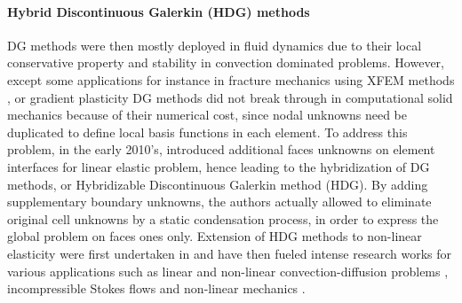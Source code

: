 
\paragraph{Hybrid Discontinuous Galerkin (HDG) methods}

DG methods were then mostly deployed in fluid dynamics \cite{shahbazi_high-order_2007, persson_discontinuous_2009} due to their local conservative property and stability in convection dominated problems.
However, except some applications for instance in fracture mechanics using XFEM methods
\cite{gracie_blending_2008, shen_stability_2010}, or gradient plasticity \cite{djoko_discontinuous_2007,djoko_discontinuous_2007-1} DG methods did not break through in computational solid mechanics because of their numerical cost, since nodal unknowns need be duplicated to define local basis functions in each element.
To address this problem, in the early 2010's, \cite{cockburn_unified_2009, soon_hybridizable_2009} introduced additional faces unknowns on element interfaces for linear elastic problem, hence leading to the hybridization of DG methods, or Hybridizable Discontinuous Galerkin method (HDG). By adding supplementary boundary unknowns, the authors actually allowed to eliminate original cell unknowns by a static condensation process, in order to express the global problem on faces ones only.
% 
% 
Extension of HDG methods to non-linear elasticity were first undertaken in \cite{soon_hybridizable_2008} and have then fueled intense research works for various applications such as linear and non-linear convection-diffusion problems \cite{nguyen_implicit_2009,nguyen_implicit_2009-1,nguyen_hybridizable_2010}, incompressible Stokes flows \cite{nguyen_hybridizable_2010, nguyen_implicit_2011} and non-linear mechanics \cite{nguyen_hybridizable_2012}.

